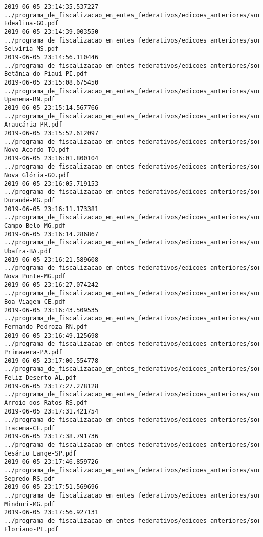 \begin{lstlisting}
2019-06-05 23:14:35.537227 ../programa_de_fiscalizacao_em_entes_federativos/edicoes_anteriores/sorteio_34/1838-Edealina-GO.pdf
2019-06-05 23:14:39.003550 ../programa_de_fiscalizacao_em_entes_federativos/edicoes_anteriores/sorteio_34/1850-Selvíria-MS.pdf
2019-06-05 23:14:56.110446 ../programa_de_fiscalizacao_em_entes_federativos/edicoes_anteriores/sorteio_34/1861-Betânia do Piauí-PI.pdf
2019-06-05 23:15:08.675450 ../programa_de_fiscalizacao_em_entes_federativos/edicoes_anteriores/sorteio_34/1869-Upanema-RN.pdf
2019-06-05 23:15:14.567766 ../programa_de_fiscalizacao_em_entes_federativos/edicoes_anteriores/sorteio_34/1863-Araucária-PR.pdf
2019-06-05 23:15:52.612097 ../programa_de_fiscalizacao_em_entes_federativos/edicoes_anteriores/sorteio_34/1884-Novo Acordo-TO.pdf
2019-06-05 23:16:01.800104 ../programa_de_fiscalizacao_em_entes_federativos/edicoes_anteriores/sorteio_34/1839-Nova Glória-GO.pdf
2019-06-05 23:16:05.719153 ../programa_de_fiscalizacao_em_entes_federativos/edicoes_anteriores/sorteio_34/1846-Durandé-MG.pdf
2019-06-05 23:16:11.173381 ../programa_de_fiscalizacao_em_entes_federativos/edicoes_anteriores/sorteio_34/1844-Campo Belo-MG.pdf
2019-06-05 23:16:14.286867 ../programa_de_fiscalizacao_em_entes_federativos/edicoes_anteriores/sorteio_34/1832-Ubaíra-BA.pdf
2019-06-05 23:16:21.589608 ../programa_de_fiscalizacao_em_entes_federativos/edicoes_anteriores/sorteio_34/1848-Nova Ponte-MG.pdf
2019-06-05 23:16:27.074242 ../programa_de_fiscalizacao_em_entes_federativos/edicoes_anteriores/sorteio_34/1833-Boa Viagem-CE.pdf
2019-06-05 23:16:43.509535 ../programa_de_fiscalizacao_em_entes_federativos/edicoes_anteriores/sorteio_34/1867-Fernando Pedroza-RN.pdf
2019-06-05 23:16:49.125698 ../programa_de_fiscalizacao_em_entes_federativos/edicoes_anteriores/sorteio_34/1855-Primavera-PA.pdf
2019-06-05 23:17:00.554778 ../programa_de_fiscalizacao_em_entes_federativos/edicoes_anteriores/sorteio_34/1826-Feliz Deserto-AL.pdf
2019-06-05 23:17:27.278128 ../programa_de_fiscalizacao_em_entes_federativos/edicoes_anteriores/sorteio_34/1870-Arroio dos Ratos-RS.pdf
2019-06-05 23:17:31.421754 ../programa_de_fiscalizacao_em_entes_federativos/edicoes_anteriores/sorteio_34/1834-Iracema-CE.pdf
2019-06-05 23:17:38.791736 ../programa_de_fiscalizacao_em_entes_federativos/edicoes_anteriores/sorteio_34/1879-Cesário Lange-SP.pdf
2019-06-05 23:17:46.859726 ../programa_de_fiscalizacao_em_entes_federativos/edicoes_anteriores/sorteio_34/1873-Segredo-RS.pdf
2019-06-05 23:17:51.569696 ../programa_de_fiscalizacao_em_entes_federativos/edicoes_anteriores/sorteio_34/1847-Minduri-MG.pdf
2019-06-05 23:17:56.927131 ../programa_de_fiscalizacao_em_entes_federativos/edicoes_anteriores/sorteio_34/1862-Floriano-PI.pdf

\end{lstlisting}
